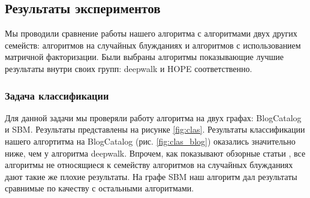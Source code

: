 \documentclass[12pt,a4paper]{extarticle}
\begin{document}
    \subsection{Результаты экспериментов}

    Мы проводили сравнение работы нашего алгоритма с алгоритмами двух других семейств: алгоритмов на случайных блужданиях и алгоритмов с использованием матричной факторизации. Были выбраны алгоритмы показывающие лучшие результаты внутри своих групп: deepwalk и HOPE соответственно.

    \subsubsection{Задача классификации}

    Для данной задачи мы проверяли работу алгоритма на двух графах: BlogCatalog и SBM. Результаты представлены на рисунке \ref{fig:clas}. Результаты классификации нашего алгортитма на BlogCatalog (рис. \ref{fig:clas_blog}) оказались значительно ниже, чем у алгоритма deepwalk. Впрочем, как показывают обзорные статьи \cite{survey}\cite{survey2}, все алгоритмы не относящиеся к семейству алгоритмов на случайных блужданиях дают такие же плохие результаты. На графе SBM наш алгоритм дал результаты сравнимые по качеству с остальными алгоритмами.
    
\end{document}
